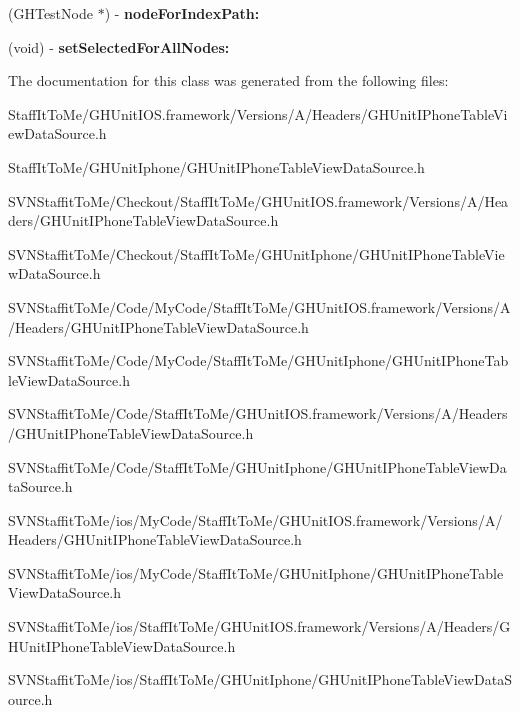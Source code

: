 \begin{DoxyCompactItemize}
\item 
\hypertarget{interface_g_h_unit_i_phone_table_view_data_source_ad0ff09714e04713e14cce29f86c18c1d}{
(\-G\-H\-Test\-Node $\ast$) -\/ {\bfseries node\-For\-Index\-Path\-:}}
\label{interface_g_h_unit_i_phone_table_view_data_source_ad0ff09714e04713e14cce29f86c18c1d}

\item 
\hypertarget{interface_g_h_unit_i_phone_table_view_data_source_ad9d70b9269f28bb22a7c5be1e35b2ae0}{
(void) -\/ {\bfseries set\-Selected\-For\-All\-Nodes\-:}}
\label{interface_g_h_unit_i_phone_table_view_data_source_ad9d70b9269f28bb22a7c5be1e35b2ae0}

\end{DoxyCompactItemize}


\-The documentation for this class was generated from the following files\-:\begin{DoxyCompactItemize}
\item 
\-Staff\-It\-To\-Me/\-G\-H\-Unit\-I\-O\-S.\-framework/\-Versions/\-A/\-Headers/\-G\-H\-Unit\-I\-Phone\-Table\-View\-Data\-Source.\-h\item 
\-Staff\-It\-To\-Me/\-G\-H\-Unit\-Iphone/\-G\-H\-Unit\-I\-Phone\-Table\-View\-Data\-Source.\-h\item 
\-S\-V\-N\-Staffit\-To\-Me/\-Checkout/\-Staff\-It\-To\-Me/\-G\-H\-Unit\-I\-O\-S.\-framework/\-Versions/\-A/\-Headers/\-G\-H\-Unit\-I\-Phone\-Table\-View\-Data\-Source.\-h\item 
\-S\-V\-N\-Staffit\-To\-Me/\-Checkout/\-Staff\-It\-To\-Me/\-G\-H\-Unit\-Iphone/\-G\-H\-Unit\-I\-Phone\-Table\-View\-Data\-Source.\-h\item 
\-S\-V\-N\-Staffit\-To\-Me/\-Code/\-My\-Code/\-Staff\-It\-To\-Me/\-G\-H\-Unit\-I\-O\-S.\-framework/\-Versions/\-A/\-Headers/\-G\-H\-Unit\-I\-Phone\-Table\-View\-Data\-Source.\-h\item 
\-S\-V\-N\-Staffit\-To\-Me/\-Code/\-My\-Code/\-Staff\-It\-To\-Me/\-G\-H\-Unit\-Iphone/\-G\-H\-Unit\-I\-Phone\-Table\-View\-Data\-Source.\-h\item 
\-S\-V\-N\-Staffit\-To\-Me/\-Code/\-Staff\-It\-To\-Me/\-G\-H\-Unit\-I\-O\-S.\-framework/\-Versions/\-A/\-Headers/\-G\-H\-Unit\-I\-Phone\-Table\-View\-Data\-Source.\-h\item 
\-S\-V\-N\-Staffit\-To\-Me/\-Code/\-Staff\-It\-To\-Me/\-G\-H\-Unit\-Iphone/\-G\-H\-Unit\-I\-Phone\-Table\-View\-Data\-Source.\-h\item 
\-S\-V\-N\-Staffit\-To\-Me/ios/\-My\-Code/\-Staff\-It\-To\-Me/\-G\-H\-Unit\-I\-O\-S.\-framework/\-Versions/\-A/\-Headers/\-G\-H\-Unit\-I\-Phone\-Table\-View\-Data\-Source.\-h\item 
\-S\-V\-N\-Staffit\-To\-Me/ios/\-My\-Code/\-Staff\-It\-To\-Me/\-G\-H\-Unit\-Iphone/\-G\-H\-Unit\-I\-Phone\-Table\-View\-Data\-Source.\-h\item 
\-S\-V\-N\-Staffit\-To\-Me/ios/\-Staff\-It\-To\-Me/\-G\-H\-Unit\-I\-O\-S.\-framework/\-Versions/\-A/\-Headers/\-G\-H\-Unit\-I\-Phone\-Table\-View\-Data\-Source.\-h\item 
\-S\-V\-N\-Staffit\-To\-Me/ios/\-Staff\-It\-To\-Me/\-G\-H\-Unit\-Iphone/\-G\-H\-Unit\-I\-Phone\-Table\-View\-Data\-Source.\-h\end{DoxyCompactItemize}
